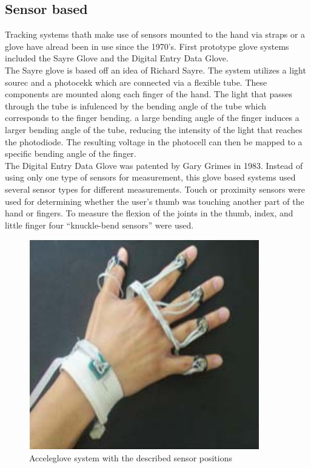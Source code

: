 \subsection{Sensor based}
\label{Sensor based}
Tracking systems thath make use of sensors mounted to the hand via straps or a glove have alread been in use since the 1970's. First prototype glove systems included the Sayre Glove\cite{ThomasA.DeFanti.1977} and the Digital Entry Data Glove\cite{Grimes.1983}.\\
The Sayre glove is based off an idea of Richard Sayre. The system utilizes a light sourec and a photocekk which are connected via a flexible tube. These components are mounted along each finger of the hand. The light that passes through the tube is infulenced by the bending angle of the tube which corresponds to the finger bending.
a large bending angle of the finger induces a larger bending angle of the tube, reducing the intensity of the light that reaches the photodiode. The resulting voltage in the photocell can then be mapped to a specific bending angle of the finger.\\
The Digital Entry Data Glove was patented by Gary Grimes in 1983. Instead of using only one type of sensors for measurement, this glove based systems used several sensor types for different measurements.
Touch or proximity sensors were used for determining whether the user’s thumb was touching another part of the hand or fingers. To measure the flexion of the joints in the thumb, index, and little finger four “knuckle-bend sensors” were used.
\begin{figure}
\label{acceleglove}
\includegraphics[scale=0.5]{images/acceleglove.JPG} 
\caption{Acceleglove system with the described sensor positions \cite{HernandezRebollar.2002}}
\end{figure}
